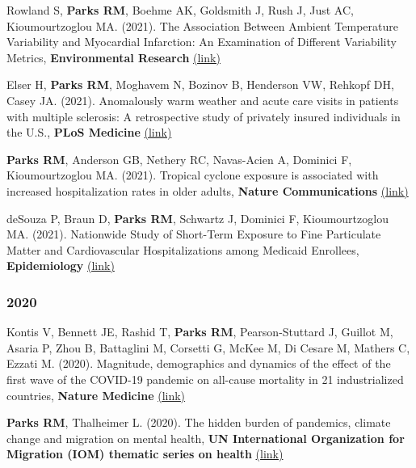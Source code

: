 \noindent Rowland S, \textbf{Parks RM}, Boehme AK, Goldsmith J, Rush J, Just AC, Kioumourtzoglou MA. (2021). The Association Between Ambient Temperature Variability and Myocardial Infarction: An Examination of Different Variability Metrics, \textbf{Environmental Research} \href{https://www.sciencedirect.com/science/article/pii/S0013935121005016}{(link)} \medskip

\noindent Elser H, \textbf{Parks RM}, Moghavem N, Bozinov B, Henderson VW, Rehkopf DH, Casey JA. (2021). Anomalously warm weather and acute care visits in patients with multiple sclerosis: A retrospective study of privately insured individuals in the U.S., \textbf{PLoS Medicine} \href{https://journals.plos.org/plosmedicine/article?id=10.1371/journal.pmed.1003580}{(link)} \medskip

\noindent \textbf{Parks RM}, Anderson GB, Nethery RC, Navas-Acien A, Dominici F, Kioumourtzoglou MA. (2021). Tropical cyclone exposure is associated with increased hospitalization rates in older adults, \textbf{Nature Communications} \href{https://www.nature.com/articles/s41467-021-21777-1}{(link)} \medskip

\noindent deSouza P, Braun D, \textbf{Parks RM}, Schwartz J, Dominici F, Kioumourtzoglou MA. (2021). Nationwide Study of Short-Term Exposure to Fine Particulate Matter and Cardiovascular Hospitalizations among Medicaid Enrollees, \textbf{Epidemiology} \href{https://journals.lww.com/epidem/Abstract/2021/01000/Nationwide_Study_of_Short_term_Exposure_to_Fine.2.aspx}{(link)}

\subsubsection*{2020}

\noindent Kontis V, Bennett JE, Rashid T, \textbf{Parks RM}, Pearson-Stuttard J, Guillot M, Asaria P, Zhou B, Battaglini M, Corsetti G, McKee M, Di Cesare M, Mathers C, Ezzati M. (2020). Magnitude, demographics and dynamics of the effect of the first wave of the COVID-19 pandemic on all-cause mortality in 21 industrialized countries, \textbf{Nature Medicine} \href{https://doi.org/10.1038/s41591-020-1112-0}{(link)} \medskip

\noindent \textbf{Parks RM}, Thalheimer L. (2020). The hidden burden of pandemics, climate change and migration on mental health, \textbf{UN International Organization for Migration (IOM) thematic series on health} \href{https://environmentalmigration.iom.int/blogs/hidden-burden-pandemics-climate-change-and-migration-mental-health}{(link)} \medskip

